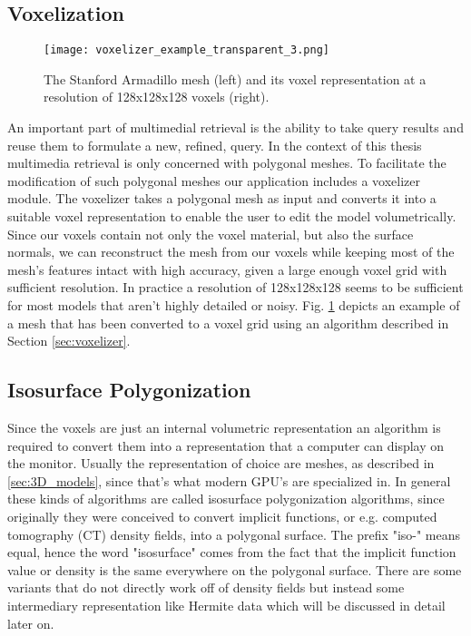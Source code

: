 \subsection{Voxelization}

\hfill

\begin{figure}
\centering
\captionsetup{width=0.8\textwidth}
\texttt{[image: voxelizer\_example\_transparent\_3.png]}
\caption{The Stanford Armadillo mesh \cite{stanford_scan_repo} (left) and its voxel representation at a resolution of 128x128x128 voxels (right).}
\label{fig:voxelizer_example}
\end{figure}

An important part of multimedial retrieval is the ability to take query results and reuse them to formulate a new, refined, query. In the context of this thesis multimedia retrieval
is only concerned with polygonal meshes. To facilitate the modification of such polygonal meshes our application includes a voxelizer module. The voxelizer takes a polygonal
mesh as input and converts it into a suitable voxel representation to enable the user to edit the model volumetrically. Since
our voxels contain not only the voxel material, but also the surface normals, we can reconstruct the mesh from our voxels while keeping most of the mesh's features intact with high accuracy, given
a large enough voxel grid with sufficient resolution. In practice a resolution of 128x128x128 seems to be sufficient for most models that aren't highly detailed or noisy.
Fig. \ref{fig:voxelizer_example} depicts an example of a mesh that has been converted to a voxel grid using an algorithm described in Section \ref{sec:voxelizer}.

\subsection{Isosurface Polygonization}

Since the voxels are just an internal volumetric representation an algorithm is required to convert them into a representation that a computer can display on the monitor. Usually the representation of choice are meshes, as described in \ref{sec:3D_models}, since that's what modern GPU's are specialized in. In general these kinds of algorithms are called isosurface polygonization algorithms, since originally they were conceived to convert implicit functions, or e.g.
computed tomography (CT) density fields, into a polygonal surface. The prefix "iso-" means equal, hence the word "isosurface" comes from the fact that the implicit function value or density is the same everywhere on the polygonal surface. There are some variants that do not directly work off of density fields but instead some intermediary representation like Hermite data which will be discussed in detail later on.

